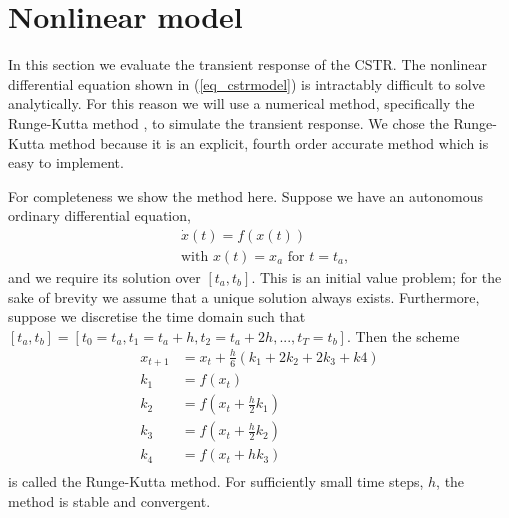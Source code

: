\section{Nonlinear model}
In this section we evaluate the transient response of the CSTR. The nonlinear differential equation shown in (\ref{eq_cstrmodel}) is intractably difficult to solve analytically. For this reason we will use a numerical method, specifically the Runge-Kutta method \cite{edwardsandpenny}, to simulate the transient response. We chose the Runge-Kutta method because it is an explicit, fourth order accurate method which is easy to implement.

For completeness we show the method here. Suppose we have an autonomous ordinary differential equation,
\begin{equation}
\begin{aligned}
&\dot{x}(t) = f(x(t)) \\
&\text{with } x(t) = x_a \text{ for } t=t_a,
\end{aligned}
\label{eq_ode}
\end{equation}
and we require its solution over $[t_a, t_b]$. This is an initial value problem; for the sake of brevity we assume that a unique solution always exists. Furthermore, suppose we discretise the time domain such that $[t_a, t_b] = [t_0=t_a, t_1= t_a+ h, t_2=t_a+ 2h,...,t_T = t_b]$. Then the scheme
\begin{equation}
\begin{aligned}
x_{t+1} &= x_{t} + \frac{h}{6}\left(k_1 + 2k_2 + 2k_3 +k4\right) \\
k_1 &= f(x_t) \\
k_2 &= f(x_t + \frac{h}{2}k_1) \\
k_3 &= f(x_t+ \frac{h}{2}k_2) \\
k_4 &= f(x_t+ hk_3) \\
\end{aligned}
\label{eq_rk}
\end{equation}
is called the Runge-Kutta method. For sufficiently small time steps, $h$, the method is stable and convergent.
  
